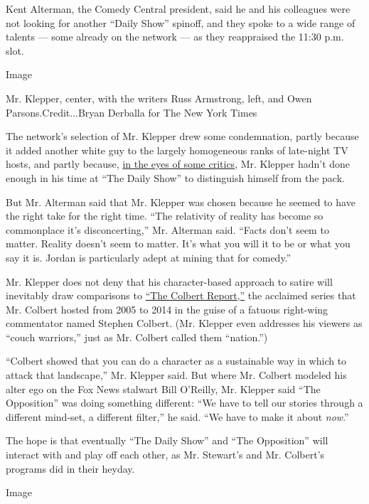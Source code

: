 Kent Alterman, the Comedy Central president, said he and his colleagues
were not looking for another ``Daily Show'' spinoff, and they spoke to a
wide range of talents --- some already on the network --- as they
reappraised the 11:30 p.m. slot.

Image

Mr. Klepper, center, with the writers Russ Armstrong, left, and Owen
Parsons.Credit...Bryan Derballa for The New York Times

The network's selection of Mr. Klepper drew some condemnation, partly
because it added another white guy to the largely homogeneous ranks of
late-night TV hosts, and partly because,
\href{https://www.theatlantic.com/entertainment/archive/2017/06/is-jordan-klepper-the-future-of-comedy-central/529932/}{in
the eyes of some critics}, Mr. Klepper hadn't done enough in his time at
``The Daily Show'' to distinguish himself from the pack.

But Mr. Alterman said that Mr. Klepper was chosen because he seemed to
have the right take for the right time. ``The relativity of reality has
become so commonplace it's disconcerting,'' Mr. Alterman said. ``Facts
don't seem to matter. Reality doesn't seem to matter. It's what you will
it to be or what you say it is. Jordan is particularly adept at mining
that for comedy.''

Mr. Klepper does not deny that his character-based approach to satire
will inevitably draw comparisons to
\href{http://www.cc.com/video-clips/wul2p2/the-colbert-report-on-topic---best-of-the-colbert-report}{``The
Colbert Report,''} the acclaimed series that Mr. Colbert hosted from
2005 to 2014 in the guise of a fatuous right-wing commentator named
Stephen Colbert. (Mr. Klepper even addresses his viewers as ``couch
warriors,'' just as Mr. Colbert called them ``nation.'')

``Colbert showed that you can do a character as a sustainable way in
which to attack that landscape,'' Mr. Klepper said. But where Mr.
Colbert modeled his alter ego on the Fox News stalwart Bill O'Reilly,
Mr. Klepper said ``The Opposition'' was doing something different: ``We
have to tell our stories through a different mind-set, a different
filter,'' he said. ``We have to make it about \emph{now}.''

The hope is that eventually ``The Daily Show'' and ``The Opposition''
will interact with and play off each other, as Mr. Stewart's and Mr.
Colbert's programs did in their heyday.

Image


